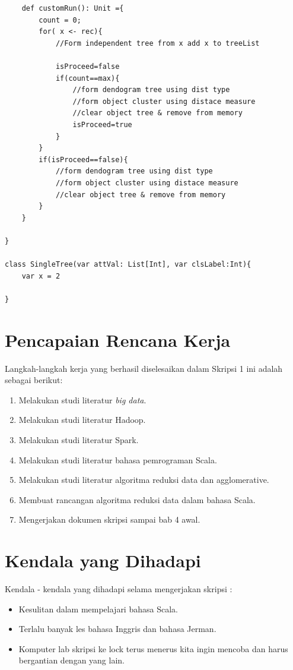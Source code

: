\documentclass[a4paper,twoside]{article}
\begin{document}
\begin{enumerate}
\begin{lstlisting}
    def customRun(): Unit ={
        count = 0;
        for( x <- rec){
            //Form independent tree from x add x to treeList
			
            isProceed=false
            if(count==max){
                //form dendogram tree using dist type
                //form object cluster using distace measure
                //clear object tree & remove from memory
                isProceed=true
            }
        }
        if(isProceed==false){
            //form dendogram tree using dist type
            //form object cluster using distace measure
            //clear object tree & remove from memory
        }
    }

}

class SingleTree(var attVal: List[Int], var clsLabel:Int){
    var x = 2

}
\end{lstlisting}

		
\end{enumerate}

\section{Pencapaian Rencana Kerja}
Langkah-langkah kerja yang berhasil diselesaikan dalam Skripsi 1 ini adalah sebagai berikut:
\begin{enumerate}
\item Melakukan studi literatur \textit{big data}.
\item Melakukan studi literatur Hadoop.
\item Melakukan studi literatur Spark.
\item Melakukan studi literatur bahasa pemrograman Scala.
\item Melakukan studi literatur algoritma reduksi data dan agglomerative.
\item Membuat rancangan algoritma reduksi data dalam bahasa Scala.
\item Mengerjakan dokumen skripsi sampai bab 4 awal.

\end{enumerate}

\section{Kendala yang Dihadapi}
Kendala - kendala yang dihadapi selama mengerjakan skripsi :
\begin{itemize}
	\item Kesulitan dalam mempelajari bahasa Scala.
	\item Terlalu banyak les bahasa Inggris dan bahasa Jerman.
	\item Komputer lab skripsi ke lock terus menerus kita ingin mencoba dan harus bergantian dengan yang lain.
\end{itemize}
\end{document}
